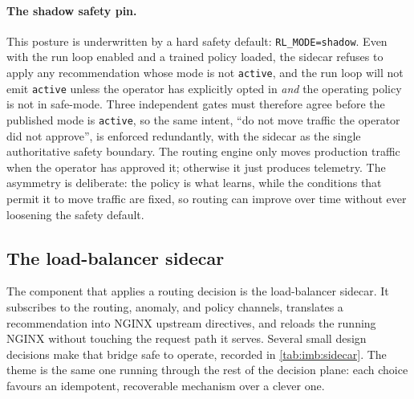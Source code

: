 \paragraph{The shadow safety pin.} This posture is underwritten by a hard safety
default: \texttt{RL\_MODE=shadow}. Even with the run loop enabled and a trained
policy loaded, the sidecar refuses to apply any recommendation whose mode is not
\texttt{active}, and the run loop will not emit \texttt{active} unless the operator
has explicitly opted in \emph{and} the operating policy is not in safe-mode. Three
independent gates must therefore agree before the published mode is \texttt{active},
so the same intent, ``do not move traffic the operator did not approve'', is
enforced redundantly, with the sidecar as the single authoritative safety boundary.
The routing engine only moves production traffic when the operator has approved it;
otherwise it just produces telemetry. The asymmetry is deliberate: the policy is
what learns, while the conditions that permit it to move traffic are fixed, so
routing can improve over time without ever loosening the safety default.

\subsection{The load-balancer sidecar}\label{imb:sidecar}

The component that applies a routing decision is the load-balancer sidecar. It
subscribes to the routing, anomaly, and policy channels, translates a
recommendation into NGINX upstream directives, and reloads the running NGINX
without touching the request path it serves. Several small design decisions make
that bridge safe to operate, recorded in \cref{tab:imb:sidecar}. The theme is the
same one running through the rest of the decision plane: each choice favours an
idempotent, recoverable mechanism over a clever one.

